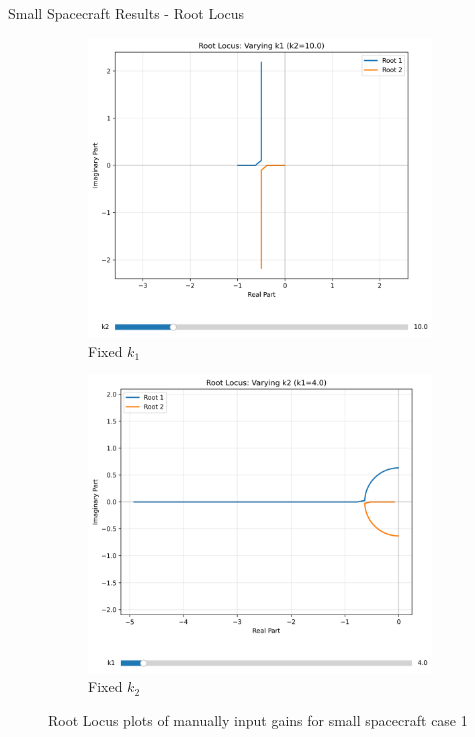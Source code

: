 \documentclass{beamer}
\begin{document}
\begin{frame}{Small Spacecraft Results - Root Locus}
    \begin{figure}[H]
    \label{Fig. 1}
    \centering
    \begin{subfigure}[b]{0.48\columnwidth}
        \label{Fig. 1.A}
        \centering
        \includegraphics[width=\linewidth]{base_k1_root_locus(4).pdf}
        \caption{Fixed $k_1$}
        \label{fig:subfig1}
    \end{subfigure}
    \hfill
    \begin{subfigure}[b]{0.48\columnwidth}
        \label{Fig. 1.B}
        \centering
        \includegraphics[width=\linewidth]{base_k2_root_locus(4).pdf}
        \caption{Fixed $k_2$}
        \label{fig:subfig2}
    \end{subfigure}
    \caption{Root Locus plots of manually input gains for small spacecraft case 1}
    \label{fig:combined}
\end{figure}
\end{frame}
\end{document}
